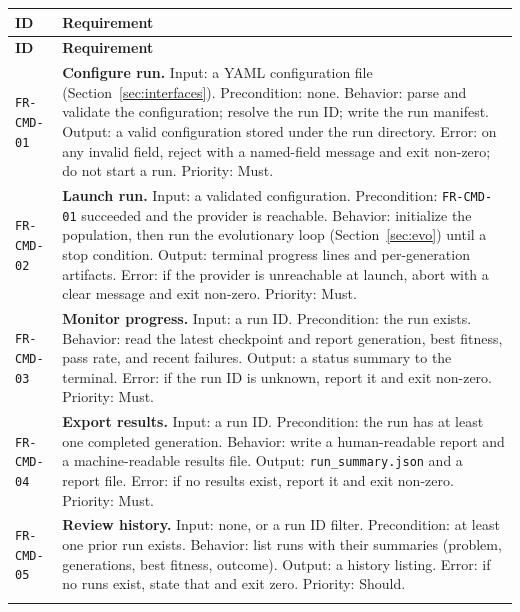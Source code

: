 \documentclass[12pt,a4paper]{article}
\begin{document}
\begin{longtable}{@{}p{2.2cm}p{10.6cm}@{}}
\toprule
\textbf{ID} & \textbf{Requirement} \\
\midrule
\endfirsthead
\toprule
\textbf{ID} & \textbf{Requirement} \\
\midrule
\endhead
\bottomrule
\endfoot

\texttt{FR-CMD-01} & \textbf{Configure run.} Input: a YAML configuration file (Section~\ref{sec:interfaces}). Precondition: none. Behavior: parse and validate the configuration; resolve the run ID; write the run manifest. Output: a valid configuration stored under the run directory. Error: on any invalid field, reject with a named-field message and exit non-zero; do not start a run. Priority: Must. \\
\addlinespace[2pt]

\texttt{FR-CMD-02} & \textbf{Launch run.} Input: a validated configuration. Precondition: \texttt{FR-CMD-01} succeeded and the provider is reachable. Behavior: initialize the population, then run the evolutionary loop (Section~\ref{sec:evo}) until a stop condition. Output: terminal progress lines and per-generation artifacts. Error: if the provider is unreachable at launch, abort with a clear message and exit non-zero. Priority: Must. \\
\addlinespace[2pt]

\texttt{FR-CMD-03} & \textbf{Monitor progress.} Input: a run ID. Precondition: the run exists. Behavior: read the latest checkpoint and report generation, best fitness, pass rate, and recent failures. Output: a status summary to the terminal. Error: if the run ID is unknown, report it and exit non-zero. Priority: Must. \\
\addlinespace[2pt]

\texttt{FR-CMD-04} & \textbf{Export results.} Input: a run ID. Precondition: the run has at least one completed generation. Behavior: write a human-readable report and a machine-readable results file. Output: \texttt{run\_summary.json} and a report file. Error: if no results exist, report it and exit non-zero. Priority: Must. \\
\addlinespace[2pt]

\texttt{FR-CMD-05} & \textbf{Review history.} Input: none, or a run ID filter. Precondition: at least one prior run exists. Behavior: list runs with their summaries (problem, generations, best fitness, outcome). Output: a history listing. Error: if no runs exist, state that and exit zero. Priority: Should. \\
\addlinespace[2pt]


\end{longtable}
\end{document}
